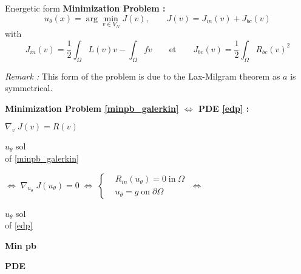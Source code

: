\begin{frame}{Energetic form}
	\textbf{Minimization Problem :}
	\begin{equation}
		u_\theta(x)=\arg\min_{v\in V_N} J(v), \qquad J(v)=J_{in}(v)+J_{bc}(v)\label{minpb_galerkin}
	\end{equation}
	with 
	\begin{equation*}
		J_{in}(v)=\frac{1}{2}\int_\Omega L(v)v - \int_\Omega fv  \qquad \text{et} \qquad J_{bc}(v)=\frac{1}{2}\int_\Omega R_{bc}(v)^2
	\end{equation*}

	\footnotesize	
	\textit{Remark :} This form of the problem is due to the Lax-Milgram theorem as $a$ is symmetrical.
	\normalsize
	
	\footnotesize
	\begin{center}
		\begin{tcolorbox}[
			colback=white, %
			colframe=other, %
			arc=2mm, %
			boxrule=0.5pt, %
			breakable, enhanced jigsaw,
			width=0.8\linewidth
			]
			
			\textbf{Minimization Problem \eqref{minpb_galerkin} $\Leftrightarrow$ PDE \eqref{edp} :}
			
			\centering
			$\nabla_v \; J(v)=R(v) \qquad $  
			
			\vspace{5pt}
			
			\begin{minipage}{0.1\linewidth}
				\centering
				$u_\theta$ sol \\
				of \eqref{minpb_galerkin}
			\end{minipage} $\Leftrightarrow \; \nabla_{u_\theta} \; J(u_\theta)=0 \; \Leftrightarrow \; \left\{\begin{aligned}
				&R_{in}(u_\theta)=0 \; \text{in} \; \Omega \\
				&u_\theta=g \; \text{on} \; \partial\Omega
			\end{aligned}\right. \; \Leftrightarrow$ \begin{minipage}{0.1\linewidth}
				\centering
				$u_\theta$ sol \\
				of \eqref{edp}
			\end{minipage}
		
			\vspace{5pt}
			
			\begin{minipage}{0.1\linewidth}
				\centering
				\textbf{Min pb}
			\end{minipage} \; \hspace{150pt} \; \begin{minipage}{0.1\linewidth}
				\centering
				\textbf{PDE}
			\end{minipage}
		\end{tcolorbox}
	\end{center}
\end{frame}

